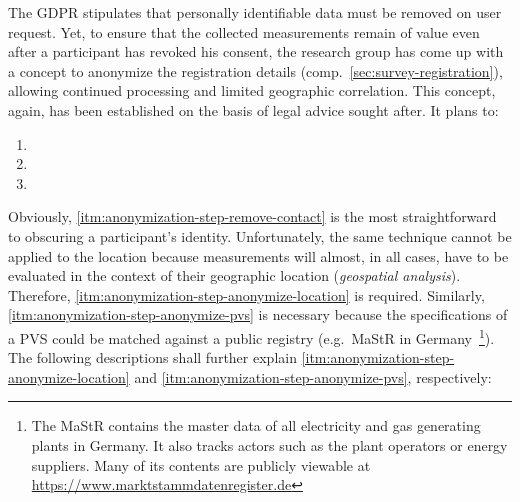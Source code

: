 The \acs{GDPR} stipulates that personally identifiable data must be removed on user request. Yet, to ensure that the collected measurements remain of value even after a participant has revoked his consent, the research group has come up with a concept to anonymize the registration details (comp.~\autoref{sec:survey-registration}), allowing continued processing and limited geographic correlation. This concept, again, has been established on the basis of legal advice sought after. It plans to:

\begin{enumerate}[label=(\Alph*)]
  \item {}
  \item {}
  \item {}
\end{enumerate}

Obviously, \ref{itm:anonymization-step-remove-contact} is the most straightforward to obscuring a participant's identity. Unfortunately, the same technique cannot be applied to the location because measurements will almost, in all cases, have to be evaluated in the context of their geographic location (\textit{geospatial analysis}). Therefore, \ref{itm:anonymization-step-anonymize-location} is required. Similarly, \ref{itm:anonymization-step-anonymize-pvs} is necessary because the specifications of a \acs{PVS} could be matched against a public registry (e.g.~\acs{MaStR} in Germany~\footnote{The \ac{MaStR} contains the master data of all electricity and gas generating plants in Germany. It also tracks actors such as the plant operators or energy suppliers. Many of its contents are publicly viewable at \url{https://www.marktstammdatenregister.de}}). The following descriptions shall further explain \ref{itm:anonymization-step-anonymize-location} and \ref{itm:anonymization-step-anonymize-pvs}, respectively:

